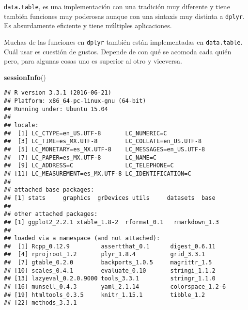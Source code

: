 \documentclass[]{article}
\newenvironment{Shaded}{\begin{snugshade}}{\end{snugshade}}
\newcommand{\KeywordTok}[1]{\textcolor[rgb]{0.13,0.29,0.53}{\textbf{{#1}}}}
\newcommand{\NormalTok}[1]{{#1}}
\begin{document}
\texttt{data.table}, es una implementación con una tradición muy
diferente y tiene también funciones muy poderosas aunque con una
sintaxis muy distinta a \texttt{dplyr}. Es absurdamente eficiente y
tiene múltiples aplicaciones.

Muchas de las funciones en \texttt{dplyr} también están implementadas en
\texttt{data.table}. Cuál usar es cuestión de gustos. Depende de con qué
se acomoda cada quién pero, para algunas cosas uno es superior al otro y
viceversa.

\printbibliography

\begin{Shaded}
\begin{Highlighting}[]
\KeywordTok{sessionInfo}\NormalTok{()}
\end{Highlighting}
\end{Shaded}

\begin{verbatim}
## R version 3.3.1 (2016-06-21)
## Platform: x86_64-pc-linux-gnu (64-bit)
## Running under: Ubuntu 15.04
## 
## locale:
##  [1] LC_CTYPE=en_US.UTF-8       LC_NUMERIC=C              
##  [3] LC_TIME=es_MX.UTF-8        LC_COLLATE=en_US.UTF-8    
##  [5] LC_MONETARY=es_MX.UTF-8    LC_MESSAGES=en_US.UTF-8   
##  [7] LC_PAPER=es_MX.UTF-8       LC_NAME=C                 
##  [9] LC_ADDRESS=C               LC_TELEPHONE=C            
## [11] LC_MEASUREMENT=es_MX.UTF-8 LC_IDENTIFICATION=C       
## 
## attached base packages:
## [1] stats     graphics  grDevices utils     datasets  base     
## 
## other attached packages:
## [1] ggplot2_2.2.1 xtable_1.8-2  rformat_0.1   rmarkdown_1.3
## 
## loaded via a namespace (and not attached):
##  [1] Rcpp_0.12.9         assertthat_0.1      digest_0.6.11      
##  [4] rprojroot_1.2       plyr_1.8.4          grid_3.3.1         
##  [7] gtable_0.2.0        backports_1.0.5     magrittr_1.5       
## [10] scales_0.4.1        evaluate_0.10       stringi_1.1.2      
## [13] lazyeval_0.2.0.9000 tools_3.3.1         stringr_1.1.0      
## [16] munsell_0.4.3       yaml_2.1.14         colorspace_1.2-6   
## [19] htmltools_0.3.5     knitr_1.15.1        tibble_1.2         
## [22] methods_3.3.1
\end{verbatim}
\end{document}

